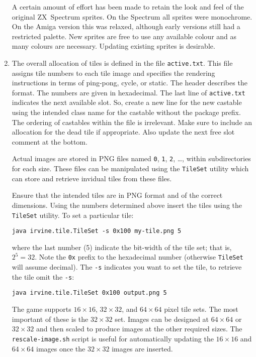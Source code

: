 \documentclass{article}
\begin{document}
\begin{enumerate}
  A certain amount of effort has been made to retain the look and feel of the original ZX~Spectrum sprites. On the Spectrum all sprites were monochrome. On the Amiga version this was relaxed, although early versions still had a restricted palette. New sprites are free to use any available colour and as many colours are necessary. Updating existing sprites is desirable.

\item The overall allocation of tiles is defined in the file {\tt active.txt}.  This file assigns tile numbers to each tile image and specifies the rendering instructions in terms of ping-pong, cycle, or static.  The header describes the format. The numbers are given in hexadecimal. The last line of {\tt active.txt} indicates the next available slot.  So, create a new line for the new castable using the intended class name for the castable without the package prefix.  The ordering of castables within the file is irrelevant. Make sure to include an allocation for the dead tile if appropriate. Also update the next free slot comment at the bottom.

  Actual images are stored in PNG files named {\tt 0}, {\tt 1}, {\tt 2}, \ldots, within subdirectories for each size. These files can be manipulated using the {\tt TileSet} utility which can store and retrieve invidual tiles from these files.

  Ensure that the intended tiles are in PNG format and of the correct dimensions. Using the numbers determined above insert the tiles using the {\tt TileSet} utility. To set a particular tile:

  \begin{center}
    {\small\tt java irvine.tile.TileSet -s 0x100 my-tile.png 5}
  \end{center}

  \noindent where the last number (5) indicate the bit-width of the tile set; that is, $2^5=32$. Note the {\tt 0x} prefix to the hexadecimal number (otherwise {\tt TileSet} will assume decimal). The {\tt -s} indicates you want to set the tile, to retrieve the tile omit the {\tt -s}:

  \begin{center}
    {\small\tt java irvine.tile.TileSet 0x100 output.png 5}
  \end{center}

  The game supports $16\times16$, $32\times32$, and $64\times64$ pixel tile sets. The most important of these is the $32\times32$ set.  Images can be designed at $64\times64$ or $32\times32$ and then scaled to produce images at the other required sizes.  The {\tt rescale-image.sh} script is useful for automatically updating the $16\times16$ and $64\times64$ images once the $32\times32$ images are inserted.


\end{enumerate}
\end{document}
